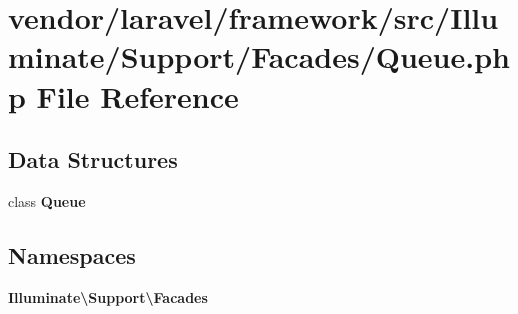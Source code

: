 \section{vendor/laravel/framework/src/\+Illuminate/\+Support/\+Facades/\+Queue.php File Reference}
\label{vendor_2laravel_2framework_2src_2_illuminate_2_support_2_facades_2queue_8php}
\subsection*{Data Structures}
\begin{DoxyCompactItemize}
\item 
class {\bf Queue}
\end{DoxyCompactItemize}
\subsection*{Namespaces}
\begin{DoxyCompactItemize}
\item 
 {\bf Illuminate\textbackslash{}\+Support\textbackslash{}\+Facades}
\end{DoxyCompactItemize}
